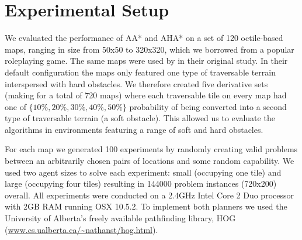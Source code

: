 \section{Experimental Setup}
We evaluated the performance of AA* and AHA* on a set of 120 octile-based maps, ranging in size from 50x50 to 320x320, which we borrowed from a popular roleplaying game.
The same maps were used by \cite{botea04} in their original study.
In their default configuration the maps only featured one type of traversable terrain interspersed with hard obstacles. 
We therefore created five derivative sets (making for a total of 720 maps) where each traversable tile on every map had one of $\lbrace 10\%, 20\%, 30\%, 40\%, 50\% \rbrace$ probability of being converted into a second type of traversable terrain (a soft obstacle). 
This allowed us to evaluate the algorithms in environments featuring a range of soft and hard obstacles.
\par \indent
For each map we generated 100 experiments by randomly creating valid problems between an arbitrarily chosen pairs of locations and some random capability.
We used two agent sizes to solve each experiment: small (occupying one tile) and large (occupying four tiles) resulting in 144000 problem instances (720x200) overall.
All experiments were conducted on a 2.4GHz Intel Core 2 Duo processor with 2GB RAM running OSX 10.5.2.
To implement both planners we used the University of Alberta's freely available pathfinding library, HOG (\url{www.cs.ualberta.ca/~nathanst/hog.html}). 
